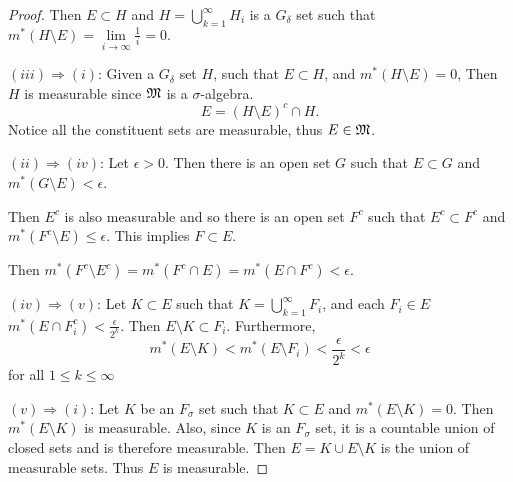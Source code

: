 \begin{pblm}
\begin{proof}
	Then $E\subset H$ and $H = \bigcup_{k=1}^\infty H_i$ is a $G_\delta$ set such that 
	$ m^\ast(H\setminus E) = \lim\limits_{i\to\infty} \frac{1}{i} = 0. $

\noindent $(iii) \Rightarrow (i)$: 
	Given a $G_\delta$ set $H$, such that $E \subset H$, and $m^\ast(H\setminus E) = 0$, 
	Then $H$ is measurable since $\mathfrak{M}$ is a $\sigma$-algebra. 
	\begin{equation*}
		E = (H\setminus E)^c \cap H.
	\end{equation*}
	Notice all the constituent sets are measurable, thus $E\in\mathfrak{M}$.  

\noindent $(ii) \Rightarrow (iv)$: 
	Let $\epsilon > 0$. Then there is an open set $G$ such that 
	$E\subset G$ and $m^\ast(G\setminus E) < \epsilon$.

	 Then $E^c$ is also measurable 
	and so there is an open set $F^c$ such that $E^c\subset F^c$ and 
	$m^\ast(F^c\setminus E) \le \epsilon$. This implies $F\subset E$. 

	Then $m^\ast(F^c\setminus E^c)=m^\ast(F^c\cap E) = m^\ast(E\cap F^c) < \epsilon$.

\noindent $(iv) \Rightarrow (v)$: 
	Let $K\subset E$ such that $K=\bigcup_{k=1}^\infty F_i$, and each $F_i\in E$  
	$m^\ast(E\cap F_i^c) < \frac{\epsilon}{2^k}$. Then $E\setminus K \subset F_i$. 
	Furthermore, 
	\begin{equation*}
		m^\ast(E\setminus K) < m^\ast(E\setminus F_i) < \frac{\epsilon}{2^k} < \epsilon 
	\end{equation*}
	for all $1 \le k \le \infty$ 

\noindent $(v) \Rightarrow (i)$: 
	Let $K$ be an $F_\sigma$ set such that $K\subset E$ and $m^\ast(E\setminus K)= 0$. 
	Then $m^\ast(E\setminus K)$ is measurable. Also, since $K$ is an $F_\sigma$ set, 
	it is a countable union of closed sets and is therefore measurable. 
	Then $E = K\cup E\setminus K$ is the union of measurable sets. 
	Thus $E$ is measurable. 

\end{proof}
\end{pblm}


